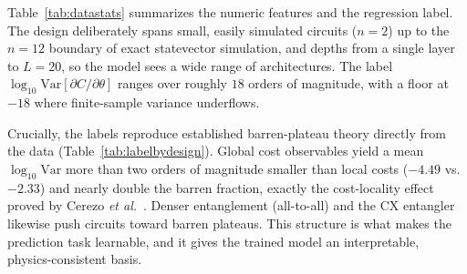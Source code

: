 \documentclass[journal]{IEEEtran}
\newcommand{\Nrows}{20{,}000}                 %
\begin{document}
\begin{table}[t]
\centering
\caption{Sampled design space. Each spec draws these parameters independently and
uniformly.}
\label{tab:designspace}
\small

\end{table}

Table~\ref{tab:datastats} summarizes the numeric features and the regression label.
The design deliberately spans small, easily simulated circuits ($n=2$) up to the
$n=12$ boundary of exact statevector simulation, and depths from a single layer to
$L=20$, so the model sees a wide range of architectures. The label
$\log_{10}\mathrm{Var}[\partial C/\partial\theta]$ ranges over roughly $18$ orders
of magnitude, with a floor at $-18$ where finite-sample variance underflows.

\begin{table}[t]
\centering
\caption{Descriptive statistics of the numeric features and the trainability label
over all \Nrows{} circuits.}
\label{tab:datastats}
\small

\end{table}

Crucially, the labels reproduce established barren-plateau theory directly from the
data (Table~\ref{tab:labelbydesign}). Global cost observables yield a mean
$\log_{10}\mathrm{Var}$ more than two orders of magnitude smaller than local costs
($-4.49$ vs.\ $-2.33$) and nearly double the barren fraction, exactly the
cost-locality effect proved by Cerezo \emph{et al.}\ \cite{cerezo2021cost}.
Denser entanglement (all-to-all) and the CX entangler likewise push circuits toward
barren plateaus. This structure is what makes the prediction task learnable, and it
gives the trained model an interpretable, physics-consistent basis.

\begin{table}[t]
\centering
\caption{Trainability broken down by design choice. Lower mean $\log_{10}\mathrm{Var}$
and higher barren \% indicate less trainable families. The data recovers known
barren-plateau drivers.}
\label{tab:labelbydesign}
\small

\end{table}
\end{document}
